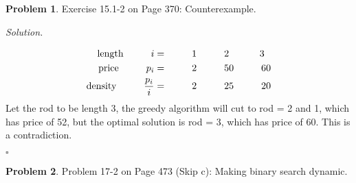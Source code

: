 \documentclass[11pt]{article}
\theoremstyle{definition}
\newtheorem{problem}{Problem}
\newenvironment{solution}{\noindent\emph{Solution.}}{\hfill$\square$}
\newcommand\tab[1][1cm]{\hspace*{#1}}
\begin{document}
\newpage



\begin{problem}
Exercise 15.1-2 on Page 370: Counterexample.
\end{problem}

\begin{solution}

\begin{align*}
\mbox{length}\tab  i =& \tab 1\tab  2  \tab \ 3\\
\mbox{price} \tab p_i =& \tab 2  \tab 50  \tab 60\\
\mbox{density} \tab \frac{p_i}{i} = & \tab 2 \tab 25 \tab 20
\end{align*}
Let the rod to be length 3, the greedy algorithm will cut to  rod = 2 and 1, which has price of 52, but the optimal solution is rod = 3, which has price of 60. This is a contradiction.


\end{solution}

\newpage



\begin{problem}
Problem 17-2 on Page 473 (Skip c): Making binary search dynamic.
\end{problem}
\end{document}
